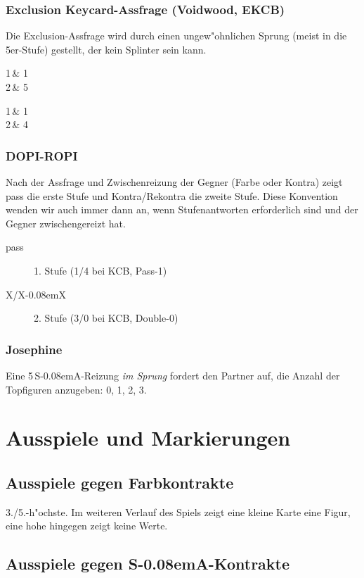 \documentclass[11pt,german,twocolumn]{scrartcl}
\renewcommand{\Cl}{{\color{ClColor}{\clubs}}}
\renewcommand{\Di}{{\color{DiColor}{\sdiamonds}}}
\renewcommand{\He}{{\color{HeColor}{\shearts}}}
\renewcommand{\Sp}{{\color{SpColor}{\spades}}}
\def\pik{\,\Sp}
\def\coe{\,\He}
\def\kar{\,\Di}
\def\tre{\,\Cl}
\def\sa{\textsf{S\kern-0.08emA}}
\def\SA{\,\sa}
\def\kontra{\textsf{X}}
\def\rekontra{\textsf{X\kern-0.08emX}}
\def\bdsc{\begin{description}}
\def\edsc{\end{description}}
\begin{document}
\subsubsection{Exclusion Keycard-Assfrage (Voidwood, EKCB)}

Die Exclusion-Assfrage wird durch einen ungew"ohnlichen Sprung
(meist in die 5er-Stufe) gestellt, der kein Splinter sein kann.

{
  1\coe & 1\pik \\
  2\coe & 5\tre{}
}
{
}

{
  1\tre & 1\kar \\
  2\kar & 4\coe{}
}
{
}

\subsubsection{DOPI-ROPI}

Nach der Assfrage und Zwischenreizung der Gegner (Farbe oder Kontra) zeigt pass
die erste Stufe und Kontra/Rekontra die zweite Stufe. Diese Konvention wenden
wir auch immer dann an, wenn Stufenantworten erforderlich sind und der Gegner
zwischengereizt hat.
%
\bdsc \item[pass] 1. Stufe (1/4 bei KCB, Pass-1) \item[\kontra/\rekontra] 2.
Stufe (3/0 bei KCB, Double-0) \edsc

\subsubsection{Josephine}

Eine 5\SA-Reizung \emph{im Sprung} fordert den Partner auf, die Anzahl der
Topfiguren anzugeben: 0, 1, 2, 3.

\section{Ausspiele und Markierungen}

\subsection{Ausspiele gegen Farbkontrakte}

3./5.-h"ochste. Im weiteren Verlauf des Spiels zeigt eine kleine Karte eine
Figur, eine hohe hingegen zeigt keine Werte.

\subsection{Ausspiele gegen \sa-Kontrakte}
\end{document}
